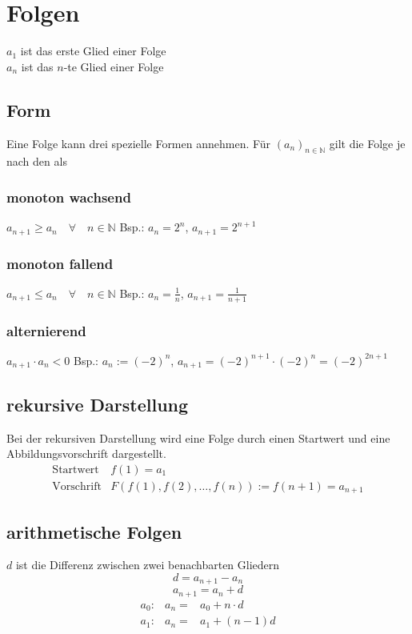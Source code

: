 \section{Folgen}
$a_1$ ist das erste Glied einer Folge\\
$a_n$ ist das $n$-te Glied einer Folge

\subsection{Form}
Eine Folge kann drei spezielle Formen annehmen. Für $(a_n)_{n \in \mathbb{N}}$ gilt die Folge je
nach den als
\subsubsection*{monoton wachsend}
$ \boxed{ a_{n+1} \geq a_n \quad \forall \quad n \in \mathbb{N} } $ Bsp.: $a_n = 2^n$, $a_{n+1} = 2^{n+1}$
\subsubsection*{monoton fallend}
$ \boxed{ a_{n+1} \leq a_n \quad \forall \quad n \in \mathbb{N} } $ Bsp.: $a_n = \frac{1}{n}$, $a_{n+1} = \frac{1}{n+1}$
\subsubsection*{alternierend}
$ \boxed{ a_{n+1} \cdot a_n < 0 } $ Bsp.: $a_n := (-2)^n$, $a_{n+1} = (-2)^{n+1} \cdot (-2)^n = (-2)^{2n+1}$

\subsection{rekursive Darstellung}
Bei der rekursiven Darstellung wird eine Folge durch einen Startwert und eine Abbildungsvorschrift dargestellt. \\
\[ \boxed{ \begin{matrix}
\text{Startwert} & f(1) = a_1 \\
\text{Vorschrift} & F(f(1), f(2), \ldots, f(n)) := f(n + 1) = a_{n + 1}
\end{matrix}} \]

\subsection{arithmetische Folgen}
$d$ ist die Differenz zwischen zwei benachbarten Gliedern\\
\[ \boxed{d = a_{n+1} - a_n} \]
\[ \boxed{a_{n+1} = a_n + d} \]
\[ \boxed{ \begin{matrix} 
a_0 :& a_n =& a_0 + n \cdot d \\
a_1 :& a_n =& a_1 + (n - 1)d 
\end{matrix}}\]


